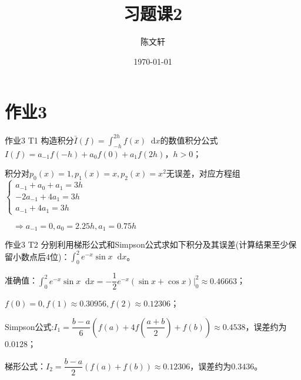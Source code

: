 \documentclass[10pt]{beamer}
\title{习题课2}
\author{陈文轩}
\date{\today}
\newcommand*{\diff}{\mathop{}\!\mathrm{d}}
\begin{document}
\frame{\titlepage}

\section{作业3}
    \begin{frame}{作业3 T1}
        构造积分$\bar{I}(f)=\int_{-h}^{2h}f(x)\diff x$的数值积分公式$I(f)=a_{-1}f(-h)+a_0 f(0)+a_1 f(2h)$，$h>0$；\vspace{1cm}

        \pause 积分对$p_0(x)=1,p_1(x)=x,p_2(x)=x^2$无误差，对应方程组$\begin{cases}a_{-1}+a_0+a_1=3h\\-2a_{-1}+4a_1=3h\\a_{-1}+4a_1=3h\end{cases}$

        \pause $\quad\Rightarrow a_{-1}=0,a_0=2.25h,a_1=0.75h$
    \end{frame}
    \begin{frame}{作业3 T2}
        分别利用梯形公式和Simpson公式求如下积分及其误差(计算结果至少保留小数点后4位)：$\int_0^2 e^{-x}\sin x\diff x$。\vspace{1cm}

        \pause 准确值：$\int_0^2 e^{-x}\sin x\diff x=-\dfrac12 e^{-x}(\sin x+\cos x)\Big|_0^2\approx 0.46663$；

        \pause $ f(0)=0,f(1)\approx0.30956,f(2)\approx0.12306$；

        \pause Simpson公式:$I_1=\dfrac{b-a}6\left(f(a)+4f\left(\dfrac{a+b}2\right)+f(b)\right)\approx0.4538$，误差约为$0.0128$；

        \pause 梯形公式：$I_2=\dfrac{b-a}{2}(f(a)+f(b))\approx0.12306$，误差约为$0.3436$。
    \end{frame}
\end{document}
